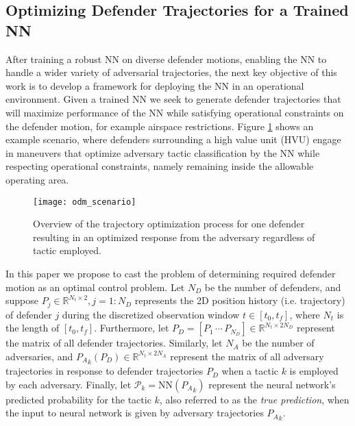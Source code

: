 \documentclass[journal]{IEEEtran} %
\begin{document}
\subsection{Optimizing Defender Trajectories for a Trained NN}


After training a robust NN on diverse defender motions, enabling the NN to handle a wider variety of adversarial trajectories, the next key objective of this work is to develop a framework for deploying the NN in an operational environment. Given a trained NN we seek to generate defender trajectories that will maximize performance of the NN while satisfying operational constraints on the defender motion, for example airspace restrictions. Figure \ref{fig:odm_scenario} shows an example scenario, where defenders surrounding a high value unit (HVU) engage in maneuvers that optimize adversary tactic classification by the NN while respecting operational constraints, namely remaining inside the allowable operating area.

\begin{figure}[h]
    \centering
    \texttt{[image: odm\_scenario]}
    \caption{Overview of the trajectory optimization process for one defender resulting in an optimized response from the adversary regardless of tactic employed.}
    \label{fig:odm_scenario}
\end{figure}

In this paper we propose to cast the problem of determining required defender motion as an optimal control problem. Let \( N_D \) be the number of defenders, and suppose \( P_j \in \mathbb{R}^{N_t \times 2}, j = 1:N_D \) represents the 2D position history (i.e. trajectory) of defender \( j \) during the discretized observation window \( t \in [t_0, t_f] \), where $N_t$  is the length of \( [t_0, t_f] \). Furthermore, let \( P_D = \left[P_1 \, \cdots \, P_{N_D}\right] \in \mathbb{R}^{N_t \times 2N_D} \) represent the matrix of all defender trajectories. Similarly, let \( N_A \) be the number of adversaries, and \( {P_A}_k(P_D) \in \mathbb{R}^{N_t \times 2N_A} \) represent the matrix of all adversary trajectories in response to defender trajectories \( P_D \) when a tactic \( k \) is employed by each adversary. Finally, let \( \mathcal{P}_k = \text{NN}({P_A}_k)\) represent the neural network’s predicted probability for the tactic \( k \), also referred to as the \textit{true prediction}, when the input to neural network is given by adversary trajectories \( {P_A}_k \).
\end{document}
